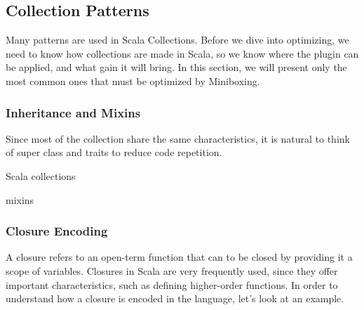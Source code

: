 % 
% 
% 
% 
% 

\subsection{Collection Patterns}

Many patterns are used in Scala Collections. Before we dive into optimizing, we need to know how collections are made in Scala, so we know where the plugin can be applied, and what gain it will bring. In this section, we will present only the most common ones that must be optimized by Miniboxing. 


\subsubsection{Inheritance and Mixins}

 Since most of the collection share the same characteristics, it is natural to think of super class and traits to reduce code repetition.

Scala collections 

mixins \cite{scalable-component-abstractions}

\subsubsection{Closure Encoding}

A closure refers to an open-term function that can to be closed by providing it a scope of variables. Closures in Scala are very frequently used, since they offer important characteristics, such as defining higher-order functions. In order to understand how a closure is encoded in the language, let's look at an example.

